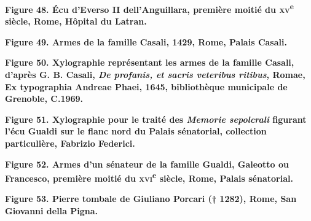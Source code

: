\documentclass[12pt,twoside,openany]{book}
\begin{document}
\begin{center}
\par\small \textbf{Figure 48. Écu d’Everso II dell’Anguillara, première moitié du \textsc{xv}\textsuperscript{e} siècle, Rome, Hôpital du Latran.}
\end{center}

\begin{center}
\par\small \textbf{Figure 49. Armes de la famille Casali, 1429, Rome, Palais Casali.}
\end{center}

\begin{center}
\par\small \textbf{Figure 50. Xylographie représentant les armes de la famille Casali, d’après G. B. Casali, \textit{De profanis, et sacris veteribus ritibus}, Romae, Ex typographia Andreae Phaei, 1645, bibliothèque municipale de Grenoble, C.1969.}
\end{center}

\begin{center}
\par\small \textbf{Figure 51. Xylographie pour le traité des \textit{Memorie sepolcrali} figurant l’écu Gualdi sur le flanc nord du Palais sénatorial, collection particulière, Fabrizio Federici.}
\end{center}

\begin{center}
\par\small \textbf{Figure 52. Armes d’un sénateur de la famille Gualdi, Galeotto ou Francesco, première moitié du \textsc{xvi}\textsuperscript{e} siècle, Rome, Palais sénatorial.}
\end{center}

\begin{center}
\par\small \textbf{Figure 53. Pierre tombale de Giuliano Porcari († 1282), Rome, San Giovanni della Pigna.}
\end{center}
\end{document}
